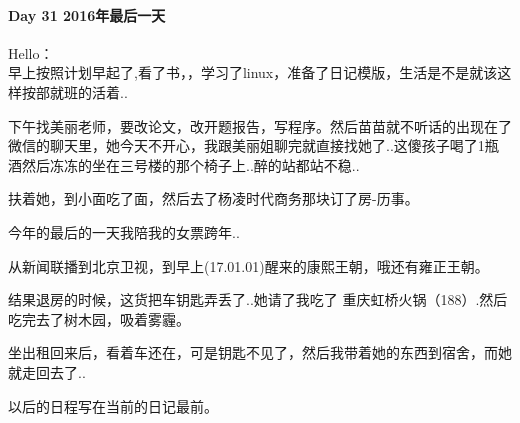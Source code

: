 \documentclass[UTF8,a4paper,8pt]{ctexbook}
\begin{document}
 	 \paragraph{Day 31   2016年最后一天   \quad     }
 		Hello：\\
 		
 		早上按照计划早起了,看了书，，学习了linux，准备了日记模版，生活是不是就该这样按部就班的活着..
 		
 		下午找美丽老师，要改论文，改开题报告，写程序。然后苗苗就不听话的出现在了微信的聊天里，她今天不开心，我跟美丽姐聊完就直接找她了..这傻孩子喝了1瓶酒然后冻冻的坐在三号楼的那个椅子上..醉的站都站不稳..
 		
 		扶着她，到小面吃了面，然后去了杨凌时代商务那块订了房-历事。
 		
 		今年的最后的一天我陪我的女票跨年..
 		
 		从新闻联播到北京卫视，到早上(17.01.01)醒来的康熙王朝，哦还有雍正王朝。
 		
 		结果退房的时候，这货把车钥匙弄丢了..她请了我吃了 重庆虹桥火锅（188）.然后吃完去了树木园，吸着雾霾。
 		
 		坐出租回来后，看着车还在，可是钥匙不见了，然后我带着她的东西到宿舍，而她就走回去了..
 		
 		以后的日程写在当前的日记最前。
      
\end{document}
